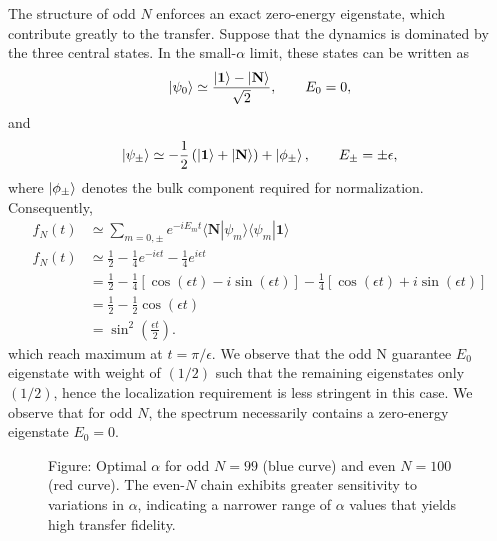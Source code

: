 \documentclass[../../../main.tex]{subfiles}
\begin{document}
The structure of odd \(N\)  enforces an exact zero-energy eigenstate, which contribute greatly to the transfer.
Suppose that the dynamics is dominated by the three central states.
In the small-$\alpha$ limit, these states can be written as
\begin{equation*}
  \ket{\psi_0}
  \simeq
  \frac{\ket{\mathbf{1}}-\ket{\mathbf{N}}}{\sqrt{2}},
  \qquad
  E_0=0,
\end{equation*}
and
\begin{equation*}
  \ket{\psi_\pm}
  \simeq
  - \frac{1}{2}
  \left(
  \ket{\mathbf{1}}
  +
  \ket{\mathbf{N}}
  \right)
  + \ket{\phi_\pm},
  \qquad
  E_\pm=\pm\epsilon,
\end{equation*}
where $\ket{\phi_\pm}$ denotes the bulk component required for normalization.
Consequently,
\begin{align*}
  f_{N}(t)
   & \simeq
  \sum_{m=0,\pm}
  e^{-iE_m t}
  \langle\mathbf N|\psi_m\rangle
  \langle\psi_m|\mathbf1\rangle \\
  f_{N}(t)
   & \simeq
  \frac{1}{2}
  -
  \frac{1}{4}e^{-i\epsilon t}
  -
  \frac{1}{4}e^{i\epsilon t}    \\
   & =
  \frac{1}{2}
  -
  \frac{1}{4}
  \left[
    \cos(\epsilon t)-i\sin(\epsilon t)
    \right]
  -
  \frac{1}{4}
  \left[
    \cos(\epsilon t)+i\sin(\epsilon t)
  \right]                       \\
   & =
  \frac{1}{2}
  -
  \frac{1}{2}\cos(\epsilon t)   \\
   & =
  \sin^2\left(\frac{\epsilon t}{2}\right).
\end{align*}
which reach maximum at $t = \pi/\epsilon$.
We observe that the odd N guarantee $E_0$ eigenstate with weight of $(1/2)$ such that the remaining eigenstates only $(1/2)$, hence the localization requirement is less stringent in this case.
We observe that for odd \(N\), the spectrum necessarily contains a zero-energy eigenstate \(E_0=0\).


\begin{figure}
  \centering
  \caption*{Figure: Optimal $\alpha$ for odd $N=99$ (blue curve) and even $N=100$ (red curve). The even-$N$ chain exhibits greater sensitivity to variations in $\alpha$, indicating a narrower range of $\alpha$ values that yields high transfer fidelity.}
\end{figure}
\end{document}

